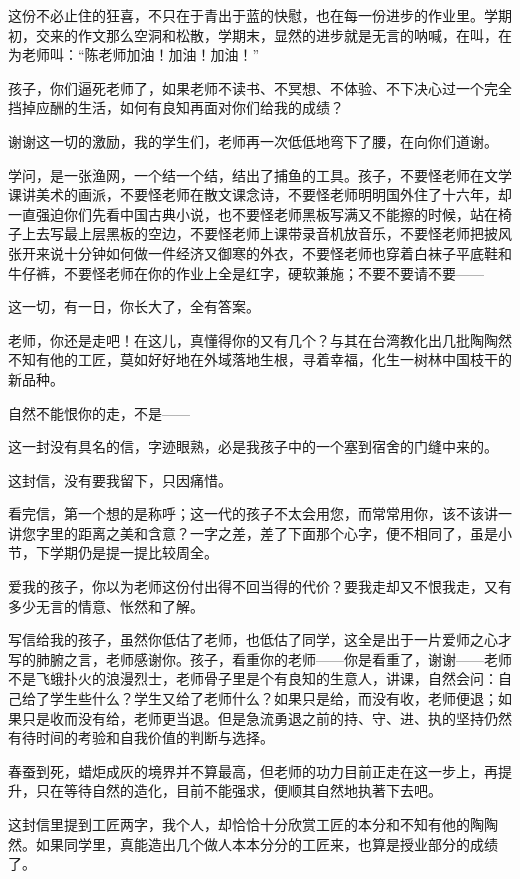 \par 这份不必止住的狂喜，不只在于青出于蓝的快慰，也在每一份进步的作业里。学期初，交来的作文那么空洞和松散，学期末，显然的进步就是无言的呐喊，在叫，在为老师叫：“陈老师加油！加油！加油！”
\par 孩子，你们逼死老师了，如果老师不读书、不冥想、不体验、不下决心过一个完全挡掉应酬的生活，如何有良知再面对你们给我的成绩？
\par 谢谢这一切的激励，我的学生们，老师再一次低低地弯下了腰，在向你们道谢。
\par 学问，是一张渔网，一个结一个结，结出了捕鱼的工具。孩子，不要怪老师在文学课讲美术的画派，不要怪老师在散文课念诗，不要怪老师明明国外住了十六年，却一直强迫你们先看中国古典小说，也不要怪老师黑板写满又不能擦的时候，站在椅子上去写最上层黑板的空边，不要怪老师上课带录音机放音乐，不要怪老师把披风张开来说十分钟如何做一件经济又御寒的外衣，不要怪老师也穿着白袜子平底鞋和牛仔裤，不要怪老师在你的作业上全是红字，硬软兼施；不要不要请不要——
\par 这一切，有一日，你长大了，全有答案。
\par 老师，你还是走吧！在这儿，真懂得你的又有几个？与其在台湾教化出几批陶陶然不知有他的工匠，莫如好好地在外域落地生根，寻着幸福，化生一树林中国枝干的新品种。
\par 自然不能恨你的走，不是——
\par 这一封没有具名的信，字迹眼熟，必是我孩子中的一个塞到宿舍的门缝中来的。
\par 这封信，没有要我留下，只因痛惜。
\par 看完信，第一个想的是称呼；这一代的孩子不太会用您，而常常用你，该不该讲一讲您字里的距离之美和含意？一字之差，差了下面那个心字，便不相同了，虽是小节，下学期仍是提一提比较周全。
\par 爱我的孩子，你以为老师这份付出得不回当得的代价？要我走却又不恨我走，又有多少无言的情意、怅然和了解。
\par 写信给我的孩子，虽然你低估了老师，也低估了同学，这全是出于一片爱师之心才写的肺腑之言，老师感谢你。孩子，看重你的老师——你是看重了，谢谢——老师不是飞蛾扑火的浪漫烈士，老师骨子里是个有良知的生意人，讲课，自然会问：自己给了学生些什么？学生又给了老师什么？如果只是给，而没有收，老师便退；如果只是收而没有给，老师更当退。但是急流勇退之前的持、守、进、执的坚持仍然有待时间的考验和自我价值的判断与选择。
\par 春蚕到死，蜡炬成灰的境界并不算最高，但老师的功力目前正走在这一步上，再提升，只在等待自然的造化，目前不能强求，便顺其自然地执著下去吧。
\par 这封信里提到工匠两字，我个人，却恰恰十分欣赏工匠的本分和不知有他的陶陶然。如果同学里，真能造出几个做人本本分分的工匠来，也算是授业部分的成绩了。
